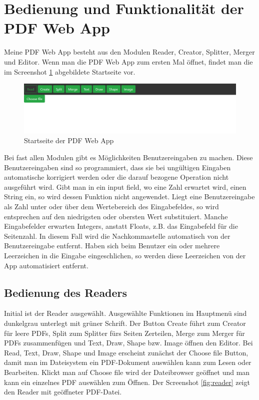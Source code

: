 \section{Bedienung und Funktionalität der PDF Web App}
Meine PDF Web App besteht aus den Modulen Reader, Creator, Splitter, Merger und Editor. Wenn man die PDF Web App zum ersten Mal öffnet, findet man die im Screenshot \ref{fig:start} abgebildete Startseite vor.

\begin{figure}[!htbp]
	\centering
	\includegraphics[width=1\textwidth]{"images/startseite.png"}
	\caption{Startseite der PDF Web App}
	\label{fig:start}
\end{figure}

Bei fast allen Modulen gibt es Möglichkeiten Benutzereingaben zu machen. Diese Benutzereingaben sind so programmiert, dass sie bei ungültigen Eingaben automatische korrigiert werden oder die darauf bezogene Operation nicht ausgeführt wird. Gibt man in ein input field, wo eine Zahl erwartet wird, einen String ein, so wird dessen Funktion nicht angewendet. Liegt eine Benutzereingabe als Zahl unter oder über dem Wertebereich des Eingabefeldes, so wird entsprechen auf den niedrigsten oder obersten Wert substituiert. Manche Eingabefelder erwarten Integers, anstatt Floats, z.B. das Eingabefeld für die Seitenzahl. In diesem Fall wird die Nachkommastelle automatisch von der Benutzereingabe entfernt. Haben sich beim Benutzer ein oder mehrere Leerzeichen in die Eingabe eingeschlichen, so werden diese Leerzeichen von der App automatisiert entfernt. 

\subsection{Bedienung des Readers}
Initial ist der Reader ausgewählt. Ausgewählte Funktionen im Hauptmenü sind dunkelgrau unterlegt mit grüner Schrift. Der Button Create führt zum Creator für leere PDFs, Split zum Splitter fürs Seiten Zerteilen, Merge zum Merger für PDFs zusammenfügen und Text, Draw, Shape bzw. Image öffnen den Editor. Bei Read, Text, Draw, Shape und Image erscheint zunächst der Choose file Button, damit man im Dateisystem ein PDF-Dokument auswählen kann zum Lesen oder Bearbeiten. Klickt man auf Choose file wird der Dateibrowser geöffnet und man kann ein einzelnes PDF auswählen zum Öffnen. Der Screenshot \ref{fig:reader} zeigt den Reader mit geöffneter PDF-Datei.

